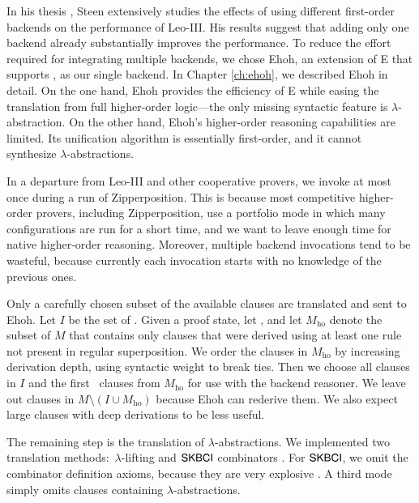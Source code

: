 In his thesis \cite[Sect.~6.1]{as-18-phd}, Steen extensively studies
the effects of using different first-order backends on the performance of
Leo-III. His results suggest that adding only one backend already substantially
improves the performance. To reduce the effort required for integrating multiple backends, we chose Ehoh, an extension of E \cite{scv-19-e23} that supports \lfsup{},  as our single
backend. In Chapter \ref{ch:ehoh}, we described Ehoh in detail.
On the one hand, Ehoh provides the efficiency of E while easing the translation from full
higher-order logic---the only missing syntactic feature is
$\lambda$-abstraction. On the other hand, Ehoh's higher-order reasoning
capabilities are limited. Its unification algorithm is essentially first-order,
and it cannot synthesize $\lambda$-abstractions.

In a departure from Leo-III and other cooperative provers,
%
we invoke  at most once during a run of Zipperposition.
This is because most competitive higher-order provers, including Zipperposition, use a portfolio
mode in which many configurations are run for a short time, and we want to
leave enough time for native higher-order reasoning. Moreover, multiple
backend invocations tend to be wasteful, because currently each invocation
starts with no knowledge of the previous ones.

Only a carefully chosen subset of the available clauses are translated and sent
to Ehoh. Let $I$ be the set of . Given a proof state, let , and let $M_\mathrm{ho}$ denote
the subset of $M$ that contains only clauses that were derived using at least
one \lsup{} rule not present in regular superposition. We order the clauses in
$M_\mathrm{ho}$ by increasing derivation depth, using syntactic weight to break
ties. Then we choose all clauses in $I$ and the first \ParamNumClauses~clauses from
$M_\mathrm{ho}$ for use with the backend reasoner.
We leave out clauses in $M \setminus (I \cup M_\mathrm{ho})$ because Ehoh can rederive them.
We also expect large clauses with deep derivations to be less useful.

The remaining step is the translation of $\lambda$-abstractions. We implemented two
translation methods:\ $\lambda$-lifting \cite{tj-1985-lambdalift} and
$\mathsf{SKBCI}$ combinators \cite{da-1979-combtrans}. For
$\mathsf{SKBCI}$, we omit the combinator definition axioms, because they are
very explosive \cite{br-20-full-sup-w-combs}. A third mode simply omits clauses
containing $\lambda$-abstractions.

